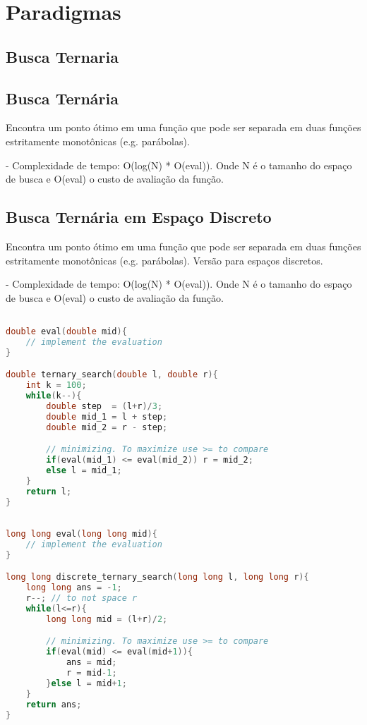 \documentclass[11pt, a4paper, twoside]{article}
\begin{document}
\newpage
%
%
%
%

\section{Paradigmas}

\subsection{Busca Ternaria}

\subsection{Busca Ternária}


Encontra um ponto ótimo em uma função que pode ser separada em duas funções estritamente monotônicas (e.g. parábolas).

- Complexidade de tempo: O(log(N) * O(eval)). Onde N é o tamanho do espaço de busca e O(eval) o custo de avaliação da função.

\subsection{Busca Ternária em Espaço Discreto}


Encontra um ponto ótimo em uma função que pode ser separada em duas funções estritamente monotônicas (e.g. parábolas).
Versão para espaços discretos.

- Complexidade de tempo: O(log(N) * O(eval)). Onde N é o tamanho do espaço de busca e O(eval) o custo de avaliação da função.
\begin{multicols}{2}
\begin{lstlisting}[language=C++]

double eval(double mid){
    // implement the evaluation
}

double ternary_search(double l, double r){
    int k = 100;
    while(k--){
        double step  = (l+r)/3;
        double mid_1 = l + step;
        double mid_2 = r - step;

        // minimizing. To maximize use >= to compare
        if(eval(mid_1) <= eval(mid_2)) r = mid_2;
        else l = mid_1;
    }
    return l;
}
\end{lstlisting}
\end{multicols}

\begin{lstlisting}[language=C++]

long long eval(long long mid){
    // implement the evaluation
}

long long discrete_ternary_search(long long l, long long r){
    long long ans = -1;
    r--; // to not space r
    while(l<=r){
        long long mid = (l+r)/2;

        // minimizing. To maximize use >= to compare
        if(eval(mid) <= eval(mid+1)){
            ans = mid;
            r = mid-1;
        }else l = mid+1;
    }
    return ans;
}
\end{lstlisting}
\end{document}

